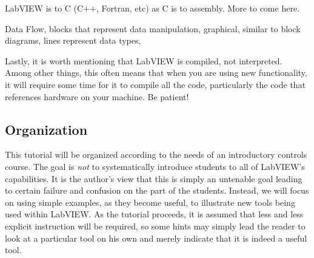 LabVIEW is to C (C++, Fortran, etc) as C is to assembly.  More to come here.

Data Flow, blocks that represent data manipulation, graphical, similar to block
diagrams, lines represent data types, 

Lastly, it is worth mentioning that LabVIEW is compiled, not interpreted.  Among
other things, this often means that when you are using new functionality, it
will require some time for it to compile all the code, particularly the code
that references hardware on your machine.  Be patient!

\subsection{Organization}

This tutorial will be organized according to the needs of an introductory
controls course.  The goal is \emph{not} to systematically introduce students to
all of LabVIEW's capabilities. It is the author's view that this is simply an
untenable goal leading to certain failure and confusion on the part of the
students.  Instead, we will focus on using simple examples, as they become
useful, to illustrate new tools being used within LabVIEW.  As the tutorial
proceeds, it is assumed that less and less explicit instruction will be
required, so some hints may simply lead the reader to look at a particular tool
on his own and merely indicate that it is indeed a useful tool.



 


